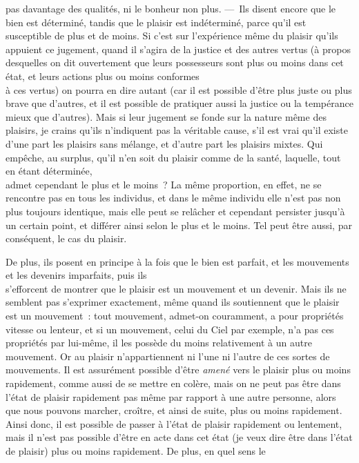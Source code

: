 \documentclass[french,twoside]{book} %
\begin{document}
pas davantage des qualités, ni le bonheur non plus. — Ils disent encore que le bien est déterminé, tandis que le plaisir est indéterminé, parce qu’il est susceptible de plus et de moins. Si c’est sur l’expérience même du plaisir qu’ils appuient ce jugement, quand il s’agira de la justice et des autres vertus (à propos desquelles on dit ouvertement que leurs possesseurs sont plus ou moins dans cet état, et leurs actions plus ou moins conformes \\
à ces vertus) on pourra en dire autant (car il est possible d’être plus juste ou plus brave que d’autres, et il est possible de pratiquer aussi la justice ou la tempérance mieux que d’autres). Mais si leur jugement se fonde sur la nature même des plaisirs, je crains qu’ils n’indiquent pas la véritable cause, s’il est vrai qu’il existe d’une part les plaisirs sans mélange, et d’autre part les plaisirs mixtes. Qui empêche, au surplus, qu’il n’en soit du plaisir comme de la santé, laquelle, tout en étant déterminée, \\
admet cependant le plus et le moins ? La même proportion, en effet, ne se rencontre pas en tous les individus, et dans le même individu elle n’est pas non plus toujours identique, mais elle peut se relâcher et cependant persister jusqu’à un certain point, et différer ainsi selon le plus et le moins. Tel peut être aussi, par conséquent, le cas du plaisir.\par
De plus, ils posent en principe à la fois que le bien est parfait, et les mouvements et les devenirs imparfaits, puis ils \\
s’efforcent de montrer que le plaisir est un mouvement et un devenir. Mais ils ne semblent pas s’exprimer exactement, même quand ils soutiennent que le plaisir est un mouvement : tout mouvement, admet-on couramment, a pour propriétés vitesse ou lenteur, et si un mouvement, celui du Ciel par exemple, n’a pas ces propriétés par lui-même, il les possède du moins relativement à un autre mouvement. Or au plaisir n’appartiennent ni l’une ni l’autre de ces sortes de mouvements. Il est assurément possible d’être {\itshape amené} vers le plaisir plus ou moins rapidement, comme aussi de se mettre en colère,  mais on ne peut pas être dans l’état de plaisir rapidement pas même par rapport à une autre personne, alors que nous pouvons marcher, croître, et ainsi de suite, plus ou moins rapidement. Ainsi donc, il est possible de passer à l’état de plaisir rapidement ou lentement, mais il n’est pas possible d’être en acte dans cet état (je veux dire être dans l’état de plaisir) plus ou moins rapidement. De plus, en quel sens le \\
\end{document}
